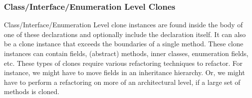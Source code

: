 \documentclass[runningheads]{llncs}
\begin{document}




\subsubsection{Class/Interface/Enumeration Level Clones}
Class/Interface/Enumeration Level clone instances are found inside the body of one of these declarations and optionally include the declaration itself. It can also be a clone instance that exceeds the boundaries of a single method. These clone instances can contain fields, (abstract) methods, inner classes, enumeration fields, etc. These types of clones require various refactoring techniques to refactor. For instance, we might have to move fields in an inheritance hierarchy. Or, we might have to perform a refactoring on more of an architectural level, if a large set of methods is cloned.
\end{document}
